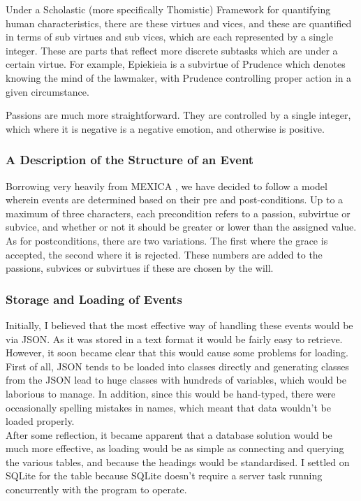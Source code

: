 \documentclass[11pt]{article}
\begin{document}
Under a Scholastic (more specifically Thomistic) Framework for quantifying human characteristics, there are these virtues and vices, and these are quantified in terms of sub virtues and sub vices, which are each represented by a single integer. These are parts that reflect more discrete subtasks which are under a certain virtue. For example, Epiekieia is a subvirtue of Prudence which denotes knowing the mind of the lawmaker, with Prudence controlling proper action in a given circumstance.

Passions are much more straightforward. They are controlled by a single integer, which where it is negative is a negative emotion, and otherwise is positive.

\subsubsection{A Description of the Structure of an Event}
Borrowing very heavily from MEXICA \cite{MEXICA}, we have decided to follow a model wherein events are determined based on their pre and post-conditions. Up to a maximum of three characters, each precondition refers to a passion, subvirtue or subvice, and whether or not it should be greater or lower than the assigned value. As for postconditions, there are two variations. The first where the grace is accepted, the second where it is rejected. These numbers are added to the passions, subvices or subvirtues if these are chosen by the will. 

\subsubsection{Storage and Loading of Events} 
Initially, I believed that the most effective way of handling these events would be via JSON. As it was stored in a text format it would be fairly easy to retrieve. However, it soon became clear that this would cause some problems for loading. First of all, JSON tends to be loaded into classes directly and generating classes from the JSON lead to huge classes with hundreds of variables, which would be laborious to manage. In addition, since this would be hand-typed, there were occasionally spelling mistakes in names, which meant that data wouldn't be loaded properly.\\

After some reflection, it became apparent that a database solution would be much more effective, as loading would be as simple as connecting and querying the various tables, and because the headings would be standardised. I settled on SQLite for the table because SQLite doesn't require a server task running concurrently with the program to operate.\\
\end{document}
